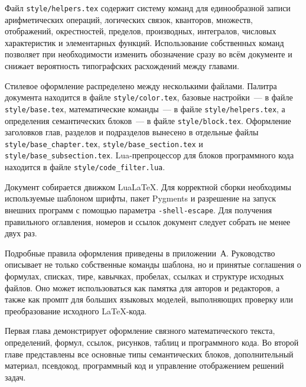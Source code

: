 Файл \verb|style/helpers.tex| содержит систему команд для единообразной записи арифметических операций, логических связок, кванторов, множеств, отображений, окрестностей, пределов, производных, интегралов, числовых характеристик и элементарных функций.
Использование собственных команд позволяет при необходимости изменить обозначение сразу во всём документе и снижает вероятность типографских расхождений между главами.

Стилевое оформление распределено между несколькими файлами.
Палитра документа находится в файле \verb|style/color.tex|, базовые настройки~--- в файле \verb|style/base.tex|, математические команды~--- в файле \verb|style/helpers.tex|, а определения семантических блоков~--- в файле \verb|style/block.tex|.
Оформление заголовков глав, разделов и подразделов вынесено в отдельные файлы \verb|style/base_chapter.tex|, \verb|style/base_section.tex| и \verb|style/base_subsection.tex|.
Lua-препроцессор для блоков программного кода находится в файле \verb|style/code_filter.lua|.

Документ собирается движком LuaLaTeX.
Для корректной сборки необходимы используемые шаблоном шрифты, пакет Pygments и разрешение на запуск внешних программ с помощью параметра \verb|-shell-escape|.
Для получения правильного оглавления, номеров и ссылок документ следует собрать не менее двух раз.

Подробные правила оформления приведены в приложении~А.
Руководство описывает не только собственные команды шаблона, но и принятые соглашения о формулах, списках, тире, кавычках, пробелах, ссылках и структуре исходных файлов.
Оно может использоваться как памятка для авторов и редакторов, а также как промпт для больших языковых моделей, выполняющих проверку или преобразование исходного \LaTeX-кода.

Первая глава демонстрирует оформление связного математического текста, определений, формул, ссылок, рисунков, таблиц и программного кода.
Во второй главе представлены все основные типы семантических блоков, дополнительный материал, псевдокод, программный код и управление отображением решений задач.